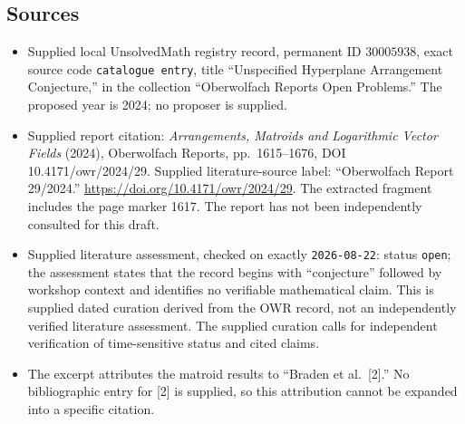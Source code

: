 \documentclass[11pt]{article}
\begin{document}
\subsection{Sources}
\begin{itemize}
\item Supplied local UnsolvedMath registry record, permanent ID \(30005938\), exact source code \texttt{catalogue entry}, title ``Unspecified Hyperplane Arrangement Conjecture,'' in the collection ``Oberwolfach Reports Open Problems.'' The proposed year is 2024; no proposer is supplied.
\item Supplied report citation: \emph{Arrangements, Matroids and Logarithmic Vector Fields} (2024), Oberwolfach Reports, pp.\ 1615--1676, DOI 10.4171/owr/2024/29. Supplied literature-source label: ``Oberwolfach Report 29/2024.'' \url{https://doi.org/10.4171/owr/2024/29}. The extracted fragment includes the page marker 1617. The report has not been independently consulted for this draft.
\item Supplied literature assessment, checked on exactly \texttt{2026-08-22}: status \texttt{open}; the assessment states that the record begins with ``conjecture'' followed by workshop context and identifies no verifiable mathematical claim. This is supplied dated curation derived from the OWR record, not an independently verified literature assessment. The supplied curation calls for independent verification of time-sensitive status and cited claims.
\item The excerpt attributes the matroid results to ``Braden et al.\ [2].'' No bibliographic entry for [2] is supplied, so this attribution cannot be expanded into a specific citation.
\end{itemize}
\end{document}
